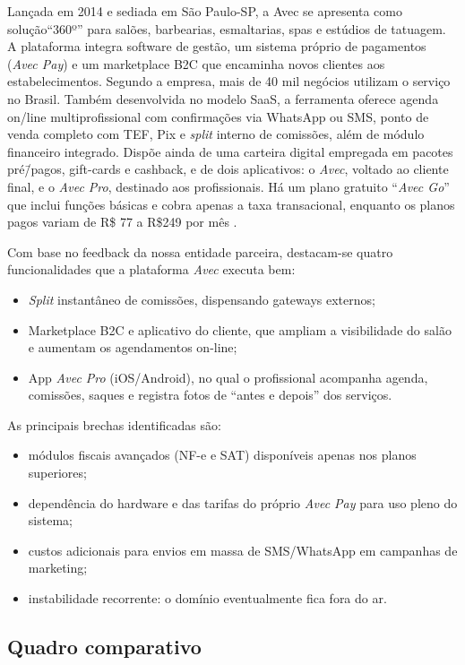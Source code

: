 Lançada em 2014 e sediada em São Paulo-SP, a Avec se apresenta como solução``360º'' para salões, barbearias, esmaltarias, spas e estúdios de tatuagem. A plataforma integra software de gestão, um sistema próprio de pagamentos (\emph{Avec Pay}) e um marketplace B2C que encaminha novos clientes aos estabelecimentos. Segundo a empresa, mais de 40 mil negócios utilizam o serviço no
Brasil. Também desenvolvida no modelo SaaS, a ferramenta oferece agenda on\-/line multiprofissional com confirmações via WhatsApp ou SMS, ponto de venda completo com TEF, Pix e \emph{split} interno de comissões, além de módulo financeiro integrado. Dispõe ainda de uma carteira digital empregada em pacotes pré\=/pagos, gift-cards
e cashback, e de dois aplicativos: o \emph{Avec}, voltado ao cliente final, e o \emph{Avec Pro}, destinado aos profissionais. Há um plano gratuito ``\emph{Avec Go}'' que inclui funções básicas e cobra apenas a taxa transacional, enquanto os planos pagos variam de R\$ 77 a
R\$249 por mês \cite{Avec}.


Com base no feedback da nossa entidade parceira, destacam-se quatro funcionalidades que
a plataforma \emph{Avec} executa bem:
\begin{itemize}
	\item \emph{Split} instantâneo de comissões, dispensando gateways externos;
	\item Marketplace B2C e aplicativo do cliente, que ampliam a visibilidade do salão e aumentam os agendamentos on-line;
	\item App \emph{Avec Pro} (iOS/Android), no qual o profissional acompanha agenda,
	comissões, saques e registra fotos de “antes e depois” dos serviços.
\end{itemize}

As principais brechas identificadas são:
\begin{itemize}
	\item módulos fiscais avançados (NF-e e SAT) disponíveis apenas nos planos superiores;
	\item dependência do hardware e das tarifas do próprio \emph{Avec Pay} para uso pleno do sistema;
	\item custos adicionais para envios em massa de SMS/WhatsApp em campanhas de marketing;
	\item instabilidade recorrente: o domínio eventualmente fica fora do ar.
\end{itemize}


\subsection{Quadro comparativo}

